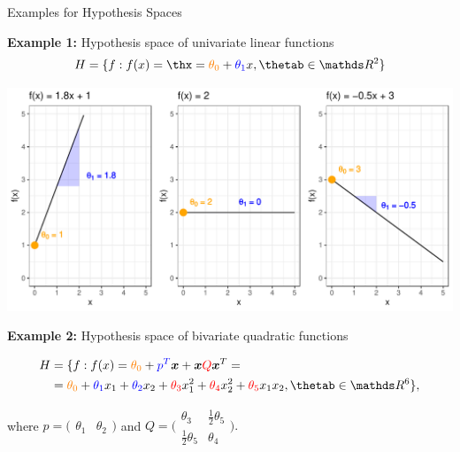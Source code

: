 \documentclass[11pt,compress,t,notes=noshow, xcolor=table]{beamer}
\begin{document}

\begin{vbframe}{Examples for Hypothesis Spaces}

\textbf{Example 1:} Hypothesis space of univariate linear functions
$$\Hspace = \{f: \fx = \thx =  \textcolor{orange}{\theta_0} + 
\textcolor{blue}{\theta_1} x, \thetab \in \R^2\}$$

\begin{center}
  \includegraphics[width = \textwidth]{figure/hs-lin-functions.pdf}
\end{center}

\framebreak

\textbf{Example 2:} Hypothesis space of bivariate quadratic functions

\begin{equation*}
  \begin{split}
    \Hspace &= \{f: \fx =  \textcolor{orange}{\theta_0} + \textcolor{blue}{p^T} 
    \xv + \xv \textcolor{red}{Q} \xv^T =  \\
    &= \textcolor{orange}{\theta_0} + \textcolor{blue}{\theta_1} x_1 + 
    \textcolor{blue}{\theta_2} x_2 + \textcolor{red}{\theta_3} x_1^2 + 
    \textcolor{red}{\theta_4} x_2^2 + \textcolor{red}{\theta_5} x_1 x_2, 
    \thetab \in \R^6\},
  \end{split}
\end{equation*}

where 
$p = \big(\begin{smallmatrix}
\theta_1 & \theta_2
\end{smallmatrix}\big)$
and
$Q = \Big(\begin{smallmatrix}
\theta_3 & \frac{1}{2} \theta_5 \\
\frac{1}{2} \theta_5 & \theta_4
\end{smallmatrix}\Big).$


\end{vbframe}
\end{document}
